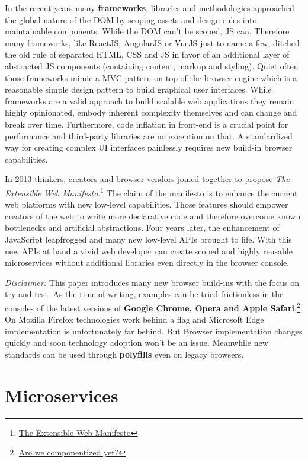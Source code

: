 \documentclass[]{assets/latex/ieee}
\begin{document}
In the recent years many \textbf{frameworks}, libraries and
methodologies approached the global nature of the DOM by scoping assets
and design rules into maintainable components. While the DOM can't be
scoped, JS can. Therefore many frameworks, like ReactJS, AngularJS or
VueJS just to name a few, ditched the old rule of separated HTML, CSS
and JS in favor of an additional layer of abstracted JS components
(containing content, markup and styling). Quiet often those frameworks
mimic a MVC pattern on top of the browser engine which is a reasonable
simple design pattern to build graphical user interfaces. While
frameworks are a valid approach to build scalable web applications they
remain highly opinionated, embody inherent complexity themselves and can
change and break over time. Furthermore, code inflation in front-end is
a crucial point for performance and third-party libraries are no
exception on that. A standardized way for creating complex UI interfaces
painlessly requires new build-in browser capabilities.

In 2013 thinkers, creators and browser vendors joined together to
propose \emph{The Extensible Web Manifesto}.\footnote{\href{https://extensiblewebmanifesto.org/}{The
  Extensible Web Manifesto}} The claim of the manifesto is to enhance
the current web platforms with new low-level capabilities. Those
features should empower creators of the web to write more declarative
code and therefore overcome known bottlenecks and artificial
abstractions. Four years later, the enhancement of JavaScript
leapfrogged and many new low-level APIs brought to life. With this new
APIs at hand a vivid web developer can create scoped and highly reusable
microservices without additional libraries even directly in the browser
console.

\emph{Disclaimer:} This paper introduces many new browser build-ins with
the focus on try and test. As the time of writing, examples can be tried
frictionless in the consoles of the latest versions of \textbf{Google
Chrome, Opera and Apple Safari}.\footnote{\href{http://jonrimmer.github.io/are-we-componentized-yet/}{Are
  we componentized yet?}} On Mozilla Firefox technologies work behind a
flag and Microsoft Edge implementation is unfortunately far behind. But
Browser implementation changes quickly and soon technology adoption
won't be an issue. Meanwhile new standards can be used through
\textbf{polyfills} even on legacy browsers.

\section{Microservices}\label{microservices}
\end{document}
